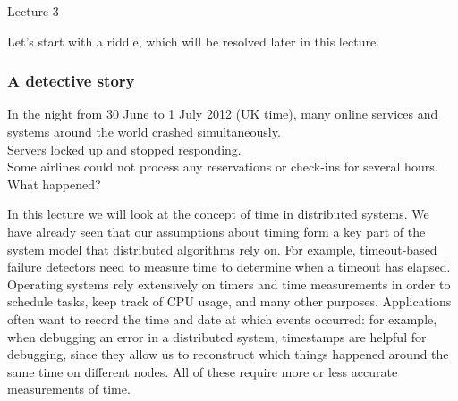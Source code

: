 \begin{frame}
    \begin{center}
        Lecture 3\\[2em]
        \Large{\color{darkblue}{Time, clocks, and ordering of events}}
    \end{center}
\end{frame}

Let's start with a riddle, which will be resolved later in this lecture.

\begin{frame}
    \label{s:mystery}
    \frametitle{A detective story}
    In the night from 30 June to 1 July 2012 (UK time), many online services and systems around the world crashed simultaneously.\\[1em]
    Servers locked up and stopped responding.\\[1em]
    Some airlines could not process any reservations or check-ins for several hours.\\[1em]
    What happened?
\end{frame}
\label{l:mystery}

In this lecture we will look at the concept of time in distributed systems.
We have already seen that our assumptions about timing form a key part of the system model that distributed algorithms rely on.
For example, timeout-based failure detectors need to measure time to determine when a timeout has elapsed.
Operating systems rely extensively on timers and time measurements in order to schedule tasks, keep track of CPU usage, and many other purposes.
Applications often want to record the time and date at which events occurred: for example, when debugging an error in a distributed system, timestamps are helpful for debugging, since they allow us to reconstruct which things happened around the same time on different nodes.
All of these require more or less accurate measurements of time.

